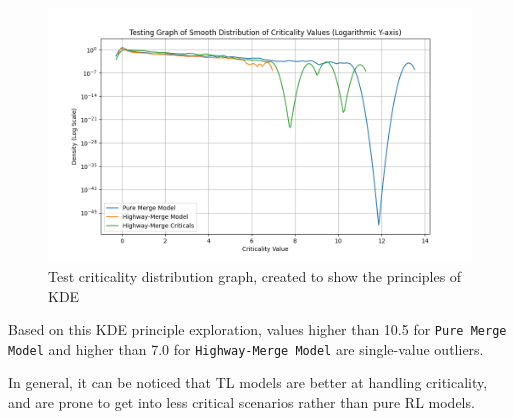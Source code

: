 \begin{figure}[H]
    \centering
    \includegraphics[width=\textwidth]{images/Test_kde.png}
    \caption{Test criticality distribution graph, created to show the principles of KDE}
    \label{fig:test_kde}
\end{figure}

Based on this KDE principle exploration, values higher than 10.5 for \texttt{Pure Merge Model} and higher than 7.0 for \texttt{Highway-Merge Model} are single-value outliers. 

In general, it can be noticed that TL models are better at handling criticality, and are prone to get into less critical scenarios rather than pure RL models.

